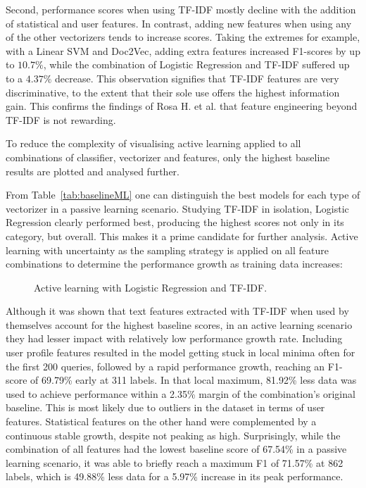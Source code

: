 \documentclass[a4paper,12pt]{article}
\begin{document}
Second, performance scores when using TF-IDF mostly decline with the addition of statistical and user features. In contrast, adding new features when using any of the other vectorizers tends to increase scores. Taking the extremes for example, with a Linear SVM and Doc2Vec, adding extra features increased F1-scores by up to $10.7\%$, while the combination of Logistic Regression and TF-IDF suffered up to a $4.37\%$ decrease. This observation signifies that TF-IDF features are very discriminative, to the extent that their sole use offers the highest information gain. This confirms the findings of Rosa H. et al.\cite{Rosa2019} that feature engineering beyond TF-IDF is not rewarding.

To reduce the complexity of visualising active learning applied to all combinations of classifier, vectorizer and features, only the highest baseline results are plotted and analysed further.%

From Table~\ref{tab:baselineML} one can distinguish the best models for each type of vectorizer in a passive learning scenario. Studying TF-IDF in isolation, Logistic Regression clearly performed best, producing the highest scores not only in its category, but overall. This makes it a prime candidate for further analysis. Active learning with uncertainty as the sampling strategy is applied on all feature combinations to determine the performance growth as training data increases:
\begin{figure}[H]
\captionsetup{justification=centering}
    \centering
    
    \caption{\label{fig:lr-tfidf}Active learning with Logistic Regression and TF-IDF.}
\end{figure}
\newpage
Although it was shown that text features extracted with TF-IDF when used by themselves account for the highest baseline scores, in an active learning scenario they had lesser impact with relatively low performance growth rate. Including user profile features resulted in the model getting stuck in local minima often for the first 200 queries, followed by a rapid performance growth, reaching an F1-score of 69.79\% early at 311 labels. In that local maximum, 81.92\% less data was used to achieve performance within a 2.35\% margin of the combination's original baseline. This is most likely due to outliers in the dataset in terms of user features. Statistical features on the other hand were complemented by a continuous stable growth, despite not peaking as high. Surprisingly, while the combination of all features had the lowest baseline score of 67.54\% in a passive learning scenario, it was able to briefly reach a maximum F1 of 71.57\% at 862 labels, which is 49.88\% less data for a 5.97\% increase in its peak performance.
\end{document}
